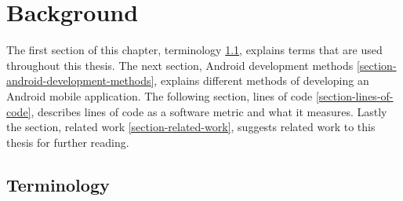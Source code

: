 \chapter{Background}\label{chapter-background}
The first section of this chapter, terminology \ref{section-terminology}, explains terms that are used throughout this thesis. The next section, Android development methods \ref{section-android-development-methods}, explains different methods of developing an Android mobile application. The following section, lines of code \ref{section-lines-of-code}, describes lines of code as a software metric and what it measures. Lastly the section, related work \ref{section-related-work}, suggests related work to this thesis for further reading. 

\section{Terminology}\label{section-terminology}
